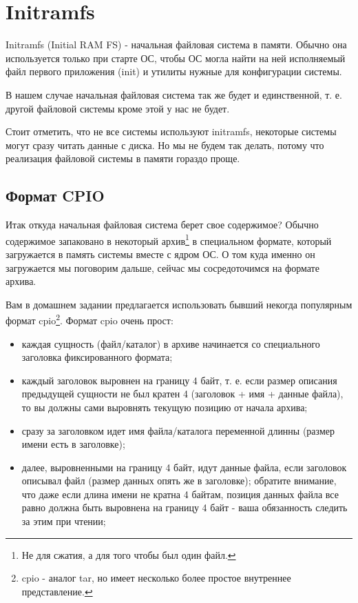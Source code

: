 \section{Initramfs}

Initramfs (Initial RAM FS) - начальная файловая система в памяти. Обычно она
используется только при старте ОС, чтобы ОС могла найти на ней исполняемый
файл первого приложения (init) и утилиты нужные для конфигурации системы.

В нашем случае начальная файловая система так же будет и единственной, т. е.
другой файловой системы кроме этой у нас не будет.

Стоит отметить, что не все системы используют initramfs, некоторые системы
могут сразу читать данные с диска. Но мы не будем так делать, потому что
реализация файловой системы в памяти гораздо проще.

\subsection{Формат CPIO}

Итак откуда начальная файловая система берет свое содержимое? Обычно
содержимое запаковано в некоторый архив\footnote{Не для сжатия, а для того
чтобы был один файл.} в специальном формате, который загружается в память
системы вместе с ядром ОС. О том куда именно он загружается мы поговорим дальше,
сейчас мы сосредоточимся на формате архива.

Вам в домашнем задании предлагается использовать бывший некогда популярным
формат cpio\footnote{cpio - аналог tar, но имеет несколько более простое
внутреннее представление.}. Формат cpio очень прост:
\begin{itemize}
  \item каждая сущность (файл/каталог) в архиве начинается со специального
        заголовка фиксированного формата;
  \item каждый заголовок выровнен на границу 4 байт, т. е. если размер
        описания предыдущей сущности не был кратен 4 (заголовок + имя + данные
        файла), то вы должны сами выровнять текущую позицию от начала архива;
  \item сразу за заголовком идет имя файла/каталога переменной длинны (размер
        имени есть в заголовке);
  \item далее, выровненными на границу 4 байт, идут данные файла, если заголовок
        описывал файл (размер данных опять же в заголовке); обратите внимание,
        что даже если длина имени не кратна 4 байтам, позиция данных файла все
        равно должна быть выровнена на границу 4 байт - ваша обязанность следить
        за этим при чтении;
\end{itemize}

